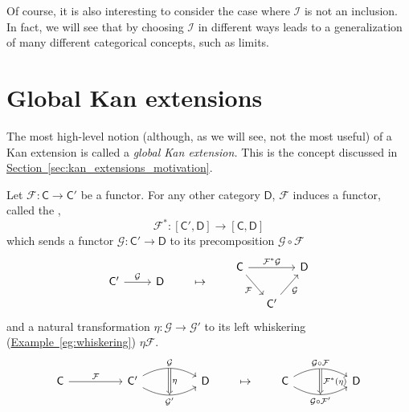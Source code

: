 \documentclass[main.tex]{subfiles}
\begin{document}
Of course, it is also interesting to consider the case where $\mathcal{I}$ is not an inclusion. In fact, we will see that by choosing $\mathcal{I}$ in different ways leads to a generalization of many different categorical concepts, such as limits.

\section{Global Kan extensions}
\label{sec:global_kan_extensions}

The most high-level notion (although, as we will see, not the most useful) of a Kan extension is called a \emph{global Kan extension.} This is the concept discussed in \hyperref[sec:kan_extensions_motivation]{Section~\ref*{sec:kan_extensions_motivation}}.

\begin{definition}[pullback]
  \label{def:pullback}
  Let $\mathcal{F}\colon \mathsf{C} \to \mathsf{C}'$ be a functor. For any other category $\mathsf{D}$, $\mathcal{F}$ induces a functor, called the ,
  \begin{equation*}
    \mathcal{F}^{*}\colon [\mathsf{C}', \mathsf{D}] \to [\mathsf{C}, \mathsf{D}]
  \end{equation*}
  which sends a functor $\mathcal{G}\colon \mathsf{C}' \to \mathsf{D}$ to its precomposition $\mathcal{G} \circ \mathcal{F}$
  \begin{equation*}
    \begin{tikzcd}
      \mathsf{C}'
      \arrow[r, "\mathcal{G}"]
      & \mathsf{D}
    \end{tikzcd}
    \qquad
    \mapsto
    \qquad
    \begin{tikzcd}[column sep=small]
      \mathsf{C}
      \arrow[dr, swap, "\mathcal{F}"]
      \arrow[rr, "\mathcal{F}^{*}\mathcal{G}"]
      && \mathsf{D}
      \\
      & \mathsf{C'}
      \arrow[ur, swap, "\mathcal{G}"]
    \end{tikzcd}
  \end{equation*}
  and a natural transformation $\eta\colon \mathcal{G} \to \mathcal{G}'$ to its left whiskering (\hyperref[eg:whiskering]{Example~\ref*{eg:whiskering}}) $\eta\mathcal{F}$.
  \begin{equation*}
    \begin{tikzcd}[column sep=huge]
      \mathsf{C}
      \arrow[r, "\mathcal{F}"]
      &\mathsf{C}'
      \arrow[r, bend left, "\mathcal{G}"{name=U}]
      \arrow[r, bend right, swap, "\mathcal{G}'"{name=D}]
      & \mathsf{D}
      \arrow[from=U, to=D, Rightarrow, "\eta"]
    \end{tikzcd}
    \qquad
    \mapsto
    \qquad
    \begin{tikzcd}[column sep=huge]
      \mathsf{C}
      \arrow[r, bend left, "\mathcal{G} \circ \mathcal{F}"{name=U}]
      \arrow[r, bend right, swap, "\mathcal{G} \circ \mathcal{F}'"{name=D}]
      & \mathsf{D}
      \arrow[from=U, to=D, Rightarrow, "\mathcal{F}^{*}(\eta)"]
    \end{tikzcd}
  \end{equation*}
\end{definition}
\end{document}
